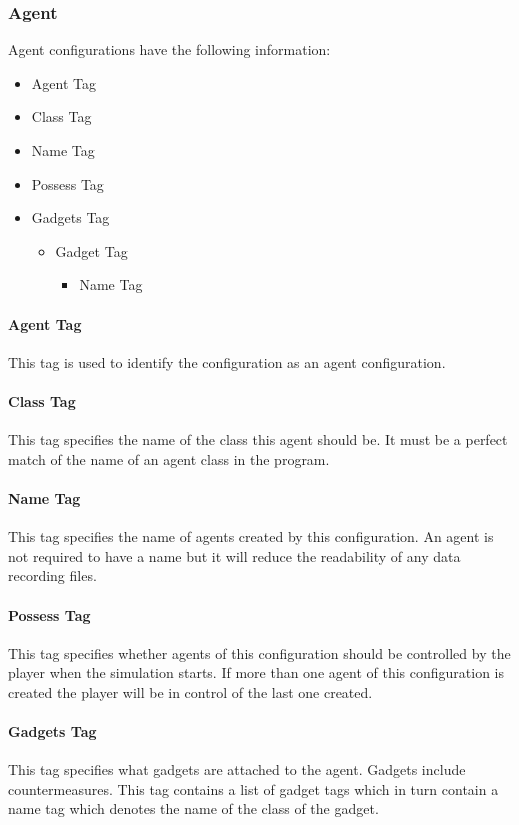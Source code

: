 \documentclass[../main.tex]{subfiles}
\begin{document}
\subsubsection{Agent}
Agent configurations have the following information:
\begin{itemize}
    \item Agent Tag
    \item Class Tag
    \item Name Tag
    \item Possess Tag
    \item Gadgets Tag
    \begin{itemize}
        \item Gadget Tag
        \begin{itemize}
            \item Name Tag
        \end{itemize}
    \end{itemize}
\end{itemize}

\paragraph{Agent Tag}
This tag is used to identify the configuration as an agent configuration.

\paragraph{Class Tag}
This tag specifies the name of the class this agent should be.
It must be a perfect match of the name of an agent class in the program.

\paragraph{Name Tag}
This tag specifies the name of agents created by this configuration.
An agent is not required to have a name but it will reduce the readability of any data recording files.

\paragraph{Possess Tag}
This tag specifies whether agents of this configuration should be controlled by the player when the simulation starts.
If more than one agent of this configuration is created the player will be in control of the last one created.

\paragraph{Gadgets Tag}
This tag specifies what gadgets are attached to the agent.
Gadgets include countermeasures.
This tag contains a list of gadget tags which in turn contain a name tag which denotes the name of the class of the gadget.
\end{document}

